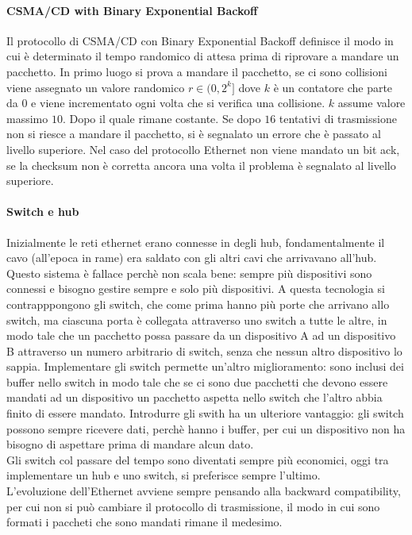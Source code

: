 \documentclass{article}
\begin{document}
\paragraph{CSMA/CD with Binary Exponential Backoff}
Il protocollo di CSMA/CD con Binary Exponential Backoff definisce il modo in cui
è determinato il tempo randomico di attesa prima di riprovare a mandare un
pacchetto. In primo luogo si prova a mandare il pacchetto, se ci sono collisioni
viene assegnato un valore randomico $r \in (0, 2^k]$ dove $k$ è un
contatore che parte da 0 e viene incrementato ogni volta che si verifica una
collisione. $k$ assume valore massimo $10$. Dopo il quale rimane costante. Se
dopo $16$ tentativi di trasmissione non si riesce a mandare il pacchetto, si
è segnalato un errore che è passato al livello superiore. Nel caso del
protocollo Ethernet non viene mandato un bit ack, se la checksum non è corretta
ancora una volta il problema è segnalato al livello superiore.

\paragraph{Switch e hub}
Inizialmente le reti ethernet erano connesse in degli hub, fondamentalmente il
cavo (all'epoca in rame) era saldato con gli altri cavi che arrivavano all'hub.
Questo sistema è fallace perchè non scala bene: sempre più dispositivi sono
connessi e bisogno gestire sempre e solo più dispositivi. A questa tecnologia si
contrapppongono gli switch, che come prima hanno più porte che arrivano allo
switch, ma ciascuna porta è collegata attraverso uno switch a tutte le altre, in
modo tale che un pacchetto possa passare da un dispositivo A ad un dispositivo B
attraverso un numero arbitrario di switch, senza che nessun altro dispositivo lo
sappia. Implementare gli switch permette un'altro miglioramento: sono inclusi
dei buffer nello switch in modo tale che se ci sono due pacchetti che devono
essere mandati ad un dispositivo un pacchetto aspetta nello switch che l'altro
abbia finito di essere mandato. Introdurre gli swith ha un ulteriore vantaggio:
gli switch possono sempre ricevere dati, perchè hanno i buffer, per cui un
dispositivo non ha bisogno di aspettare prima di mandare alcun dato.\\
Gli switch col passare del tempo sono diventati sempre più economici, oggi tra
implementare un hub e uno switch, si preferisce sempre l'ultimo.\\

L'evoluzione dell'Ethernet avviene sempre pensando alla backward compatibility,
per cui non si può cambiare il protocollo di trasmissione, il modo in cui sono
formati i paccheti che sono mandati rimane il medesimo.
\end{document}
